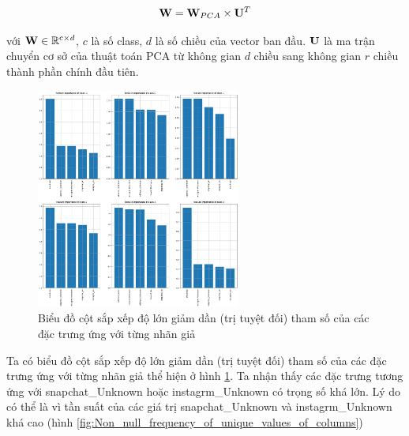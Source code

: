 \begin{enumerate}[label=(\alph*)]
    \begin{equation*}
        \bold{W} =   \bold{W}_{PCA} \times \bold{U}^T
    \end{equation*}

    với $\bold{W} \in \mathbb{R}^{\mathrm{c} \times d}$, $c$ là số class, $d$ là số chiều của vector ban đầu.
    $\bold{U}$ là ma trận chuyển cơ sở của thuật toán PCA từ không gian $d$ chiều sang không gian $r$ chiều thành phần chính đầu tiên.

    \begin{figure}[H]
        \centering
        \includegraphics[width=0.6\textwidth]{figures/Thanh/Data_Analysis/Non_null_Feature_Importance_Logistic_PCA_features.png}
        \caption{Biểu đồ cột sắp xếp độ lớn giảm dần (trị tuyệt đối) tham số của các đặc trưng ứng với từng nhãn giả}
        \label{fig:Non_null_Feature_Importance_Logistic_PCA_features}
    \end{figure}

    Ta có biểu đồ cột sắp xếp độ lớn giảm dần (trị tuyệt đối) tham số của các đặc trưng ứng với từng nhãn giả thể hiện ở hình \ref{fig:Non_null_Feature_Importance_Logistic_PCA_features}.
    Ta nhận thấy các đặc trưng tương ứng với snapchat\_Unknown hoặc instagrm\_Unknown có trọng số khá lớn.
    Lý do có thể là vì tần suất của các giá trị snapchat\_Unknown và instagrm\_Unknown khá cao (hình \ref{fig:Non_null_frequency_of_unique_values_of_columns})


\end{enumerate}
